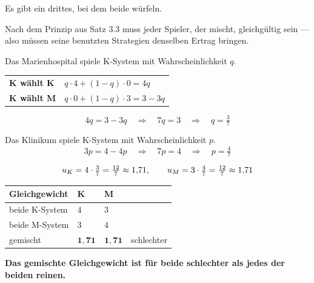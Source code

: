 \begin{merksatz}
Es gibt ein drittes, bei dem beide würfeln.

Nach dem Prinzip aus Satz 3.3 muss jeder Spieler, der mischt, gleichgültig sein --- also müssen seine benutzten Strategien denselben Ertrag bringen.

Das Marienhospital spiele K-System mit Wahrscheinlichkeit $q$.
\begin{center}
{\small
\renewcommand{\arraystretch}{1.5}
\begin{tabular}{@{}P{2.2cm}P{4.0cm}@{}}
\toprule
\textbf{K wählt K} & $q\cdot4 + (1-q)\cdot0 = 4q$\\
\textbf{K wählt M} & $q\cdot0 + (1-q)\cdot3 = 3-3q$\\
\bottomrule
\end{tabular}}
\end{center}

\[ 4q = 3-3q \quad\Longrightarrow\quad 7q = 3 \quad\Longrightarrow\quad q = \tfrac37 \]

Das Klinikum spiele K-System mit Wahrscheinlichkeit $p$.
\[ 3p = 4-4p \quad\Longrightarrow\quad 7p = 4 \quad\Longrightarrow\quad p = \tfrac47 \]

\[ u_K = 4\cdot\tfrac37 = \tfrac{12}{7} \approx 1{,}71, \qquad u_M = 3\cdot\tfrac47 = \tfrac{12}{7} \approx 1{,}71 \]

\begin{center}
{\small
\renewcommand{\arraystretch}{1.5}
\begin{tabular}{@{}P{2.8cm}P{2.0cm}P{2.0cm}P{1.6cm}@{}}
\toprule
\textbf{Gleichgewicht} & \textbf{K} & \textbf{M} & \\
\midrule
beide K-System & $4$ & $3$ & \\
beide M-System & $3$ & $4$ & \\
gemischt & $\mathbf{1{,}71}$ & $\mathbf{1{,}71}$ & \textcolor{akzent}{schlechter}\\
\bottomrule
\end{tabular}}
\end{center}

\begin{center}
\begin{minipage}{0.9\textwidth}
\textbf{Das gemischte Gleichgewicht ist für beide schlechter als jedes der beiden reinen.}
\end{minipage}
\end{center}


\end{merksatz}

